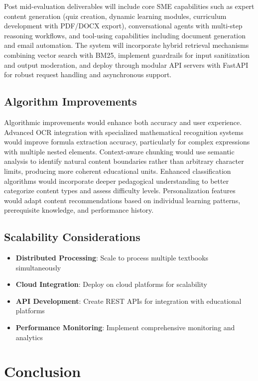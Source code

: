 \documentclass[12pt]{article}
\begin{document}
Post mid-evaluation deliverables will include core SME capabilities such as expert content generation (quiz creation, dynamic learning modules, curriculum development with PDF/DOCX export), conversational agents with multi-step reasoning workflows, and tool-using capabilities including document generation and email automation. The system will incorporate hybrid retrieval mechanisms combining vector search with BM25, implement guardrails for input sanitization and output moderation, and deploy through modular API servers with FastAPI for robust request handling and asynchronous support.

\subsection{Algorithm Improvements}

Algorithmic improvements would enhance both accuracy and user experience. Advanced OCR integration with specialized mathematical recognition systems would improve formula extraction accuracy, particularly for complex expressions with multiple nested elements. Context-aware chunking would use semantic analysis to identify natural content boundaries rather than arbitrary character limits, producing more coherent educational units. Enhanced classification algorithms would incorporate deeper pedagogical understanding to better categorize content types and assess difficulty levels. Personalization features would adapt content recommendations based on individual learning patterns, prerequisite knowledge, and performance history.

\subsection{Scalability Considerations}

\begin{itemize}
    \item \textbf{Distributed Processing}: Scale to process multiple textbooks simultaneously
    \item \textbf{Cloud Integration}: Deploy on cloud platforms for scalability
    \item \textbf{API Development}: Create REST APIs for integration with educational platforms
    \item \textbf{Performance Monitoring}: Implement comprehensive monitoring and analytics
\end{itemize}

\section{Conclusion}
\end{document}
